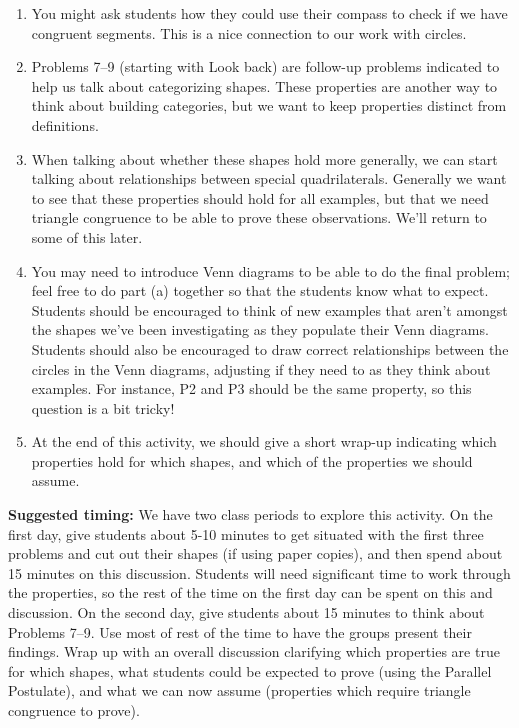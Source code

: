 \documentclass[noauthor, nooutcomes]{ximera}
\begin{document}
\begin{instructorNotes}
\begin{enumerate}
\item You might ask students how they could use their compass to check if we have congruent segments.  This is a nice connection to our work with circles.
\item Problems 7--9 (starting with Look back) are follow-up problems indicated to help us talk about categorizing shapes. These properties are another way to think about building categories, but we want to keep properties distinct from definitions. 
\item When talking about whether these shapes hold more generally, we can start talking about relationships between special quadrilaterals. Generally we want to see that these properties should hold for all examples, but that we need triangle congruence to be able to prove these observations. We'll return to some of this later.
\item You may need to introduce Venn diagrams to be able to do the final problem; feel free to do part (a) together so that the students know what to expect. Students should be encouraged to think of new examples that aren't amongst the shapes we've been investigating as they populate their Venn diagrams. Students should also be encouraged to draw correct relationships between the circles in the Venn diagrams, adjusting if they need to as they think about examples. For instance, P2 and P3 should be the same property, so this question is a bit tricky!
\item At the end of this activity, we should give a short wrap-up indicating which properties hold for which shapes, and which of the properties we should assume.
\end{enumerate}


{\bf Suggested timing:} We have two class periods to explore this activity. On the first day, give students about 5-10 minutes to get situated with the first three problems and cut out their shapes (if using paper copies), and then spend about 15 minutes on this discussion. Students will need significant time to work through the properties, so the rest of the time on the first day can be spent on this and discussion. On the second day, give students about 15 minutes to think about Problems 7--9. Use most of rest of the time to have the groups present their findings. Wrap up with an overall discussion clarifying which properties are true for which shapes, what students could be expected to prove (using the Parallel Postulate), and what we can now assume (properties which require triangle congruence to prove).
\end{instructorNotes}
\end{document}
